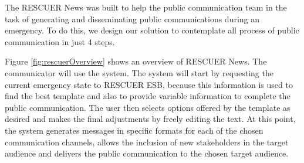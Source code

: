 The RESCUER News was built to help the public communication team in the task of generating and disseminating public communications during an emergency. To do this, we design our solution to contemplate all process of public communication in just 4 steps.

Figure \ref{fig:rescuerOverview} shows an overview of RESCUER News. The communicator will use the system. The system will start by requesting the current emergency state to RESCUER ESB, because this information is used to find the best template and also to provide variable information to complete the public communication. The user then selects options offered by the template as desired and makes the final adjustments by freely editing the text. At this point, the system generates messages in specific formats for each of the chosen communication channels, allows the inclusion of new stakeholders in the target audience and delivers the public communication to the chosen target audience.


